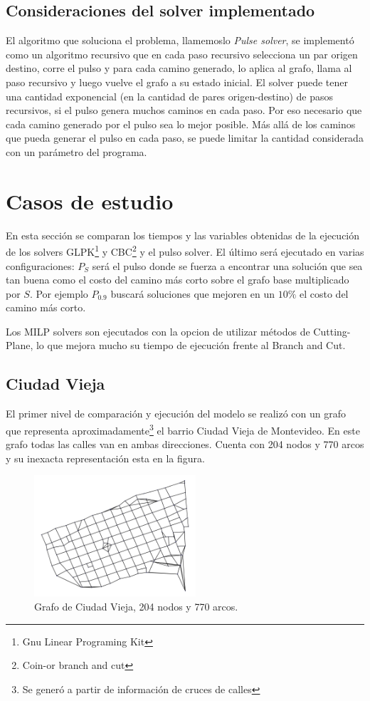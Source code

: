 \documentclass{article}
\begin{document}
  \subsection*{Consideraciones del solver implementado}

  El algoritmo que soluciona el problema, llamemoslo {\it Pulse solver}, se implementó como un algoritmo recursivo que en cada paso recursivo selecciona un par origen destino, corre el pulso y para cada camino generado, lo aplica al grafo, llama al paso recursivo y luego vuelve el grafo a su estado inicial. El solver puede tener una cantidad exponencial (en la cantidad de pares origen-destino) de pasos recursivos, si el pulso genera muchos caminos en cada paso. Por eso necesario que cada camino generado por el pulso sea lo mejor posible. Más allá de los caminos que pueda generar el pulso en cada paso, se puede limitar la cantidad considerada con un parámetro del programa.

  \section*{Casos de estudio}

  En esta sección se comparan los tiempos y las variables obtenidas de la ejecución de los solvers GLPK\footnote{Gnu Linear Programing Kit} y CBC\footnote{Coin-or branch and cut} y el pulso solver. El último será ejecutado en varias configuraciones: $P_S$ será el pulso donde se fuerza a encontrar una solución que sea tan buena como el costo del camino más corto sobre el grafo base multiplicado por $S$. Por ejemplo $P_{0.9}$ buscará soluciones que mejoren en un $10\%$ el costo del camino más corto.

  Los MILP solvers son ejecutados con la opcion de utilizar métodos de Cutting-Plane, lo que mejora mucho su tiempo de ejecución frente al Branch and Cut.

  \subsection*{Ciudad Vieja}

  El primer nivel de comparación y ejecución del modelo se realizó con un grafo que representa aproximadamente\footnote{Se generó a partir de información de cruces de calles} el barrio Ciudad Vieja de Montevideo. En este grafo todas las calles van en ambas direcciones. Cuenta con 204 nodos y 770 arcos y su inexacta representación esta en la figura.

  \begin{figure}[]
    \centering
    \includegraphics[width=6cm]{imgs/mdeo_med.png}
    \caption{Grafo de Ciudad Vieja, 204 nodos y 770 arcos.}
    \label{ciudadvieja}
  \end{figure}
\end{document}
